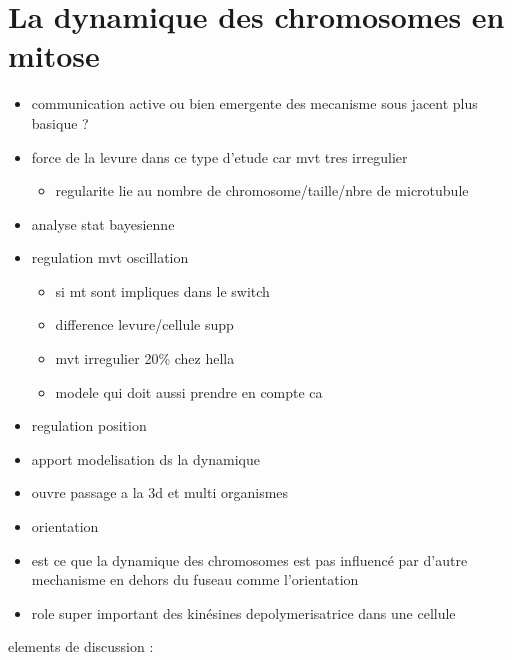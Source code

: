 \documentclass[12pt,a4paper,twoside,openright]{book}
\providecommand{\tightlist}{%
  \setlength{\itemsep}{0pt}\setlength{\parskip}{0pt}}
\begin{document}
\section{La dynamique des chromosomes en
mitose}\label{la-dynamique-des-chromosomes-en-mitose}

\begin{itemize}
\item
  communication active ou bien emergente des mecanisme sous jacent plus
  basique ?
\item
  force de la levure dans ce type d'etude car mvt tres irregulier

  \begin{itemize}
  \tightlist
  \item
    regularite lie au nombre de chromosome/taille/nbre de microtubule
  \end{itemize}
\item
  analyse stat bayesienne
\item
  regulation mvt oscillation

  \begin{itemize}
  \tightlist
  \item
    si mt sont impliques dans le switch
  \item
    difference levure/cellule supp
  \item
    mvt irregulier 20\% chez hella
  \item
    modele qui doit aussi prendre en compte ca
  \end{itemize}
\item
  regulation position
\item
  apport modelisation ds la dynamique
\item
  ouvre passage a la 3d et multi organismes
\item
  orientation
\item
  est ce que la dynamique des chromosomes est pas influencé par d'autre
  mechanisme en dehors du fuseau comme l'orientation
\item
  role super important des kinésines depolymerisatrice dans une cellule
\end{itemize}

elements de discussion :
\end{document}
